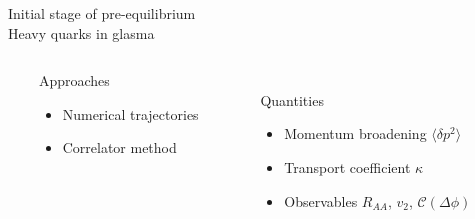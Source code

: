 \documentclass[aspectratio=169,11pt,usenames,dvipsnames]{beamer}
\begin{document}
\begin{frame}{}
    \begin{center}
        \vspace{1cm}
        {\large\color{normal}Initial stage of pre-equilibrium}\\[0.3cm]
        {\huge\color{destacado}Heavy quarks in glasma}\\[0.3cm]
        {\large\color{normal}
        \begin{center}
            \begin{columns}
                \begin{column}{0.066\textwidth}\end{column}
                \begin{column}{0.35\textwidth}
                    \centering
                    {\Large\color{ming} Approaches}\vspace{2pt}
                    \begin{itemize}
                        \item Numerical trajectories
                        \item Correlator method
                    \end{itemize}
                \end{column}
                \begin{column}{0.066\textwidth}\end{column}
                \begin{column}{0.45\textwidth}
                    \centering
                    \\[10pt]
                    {\Large\color{pinky} Quantities}
                    \begin{itemize}
                        \item Momentum broadening $\langle \delta p^2\rangle$
                        \item Transport coefficient $\kappa$
                        \item Observables $R_{AA}$, $v_2$, $\mathcal{C}(\Delta\phi)$
                    \end{itemize}
                \end{column}
                \begin{column}{0.066\textwidth}\end{column}
            \end{columns}
        \end{center}
        }
    \end{center}
\end{frame}
\end{document}
